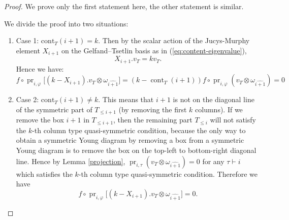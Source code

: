 \documentclass[11pt]{amsart}
\numberwithin{equation}{section}
\theoremstyle{definition}
\renewcommand{\phi}{\varphi}
\begin{document}
\begin{proof}
 We prove only the first statement here, the other statement is similar. 
 
 We divide the proof into two situations:
            \begin{enumerate}
            
            \item Case 1: \( \mathrm{cont}_{T}(\boxed{i+1})=k\). Then by the scalar action of the Jucys-Murphy element $X_{i+1}$ on the Gelfand–Tsetlin basis as in (\ref{eq:content-eigenvalue}),
            \[  X_{i+1}.v_{T}=kv_{T} . \]
            Hence we have:
             \[f\circ\operatorname{pr}_{i,\phi}\big[(k-X_{i+1}).v_{T} \otimes \omega_{\hat{i+1}}\big]=(k-\operatorname{cont}_{T}(\boxed{i+1}))f\circ\operatorname{pr}_{i,\phi}(v_{T}\otimes\omega_{\hat{i+1}})=0
             \]
             
             \item
            Case 2: \( \mathrm{cont}_{T}(\boxed{i+1})\neq k \).  This means that $\boxed{i+1}$ is not on the diagonal line of  the symmetric part of $T_{\leq i+1}$ (by removing the first $k$ columns). If we remove the box $\boxed{i+1}$ in $T_{\leq i+1}$, then the remaining part $T_{\leq i}$ will not satisfy the $k$-th column type quasi-symmetric condition, because the only way to obtain a symmetric Young diagram by removing a box from a symmetric Young diagram is to remove the box on the top-left to bottom-right diagonal line. 
           Hence by Lemma \ref{projection}, $\operatorname{pr}_{i, \tau}(v_{T}\otimes\omega_{\hat{i+1}})=0$ for any $\tau\vdash i$ which satisfies the $k$-th column type quasi-symmetric condition.
           Therefore we have 
           \[f\circ\operatorname{pr}_{i,\phi}\big[(k-X_{i+1}).v_{T} \otimes \omega_{\hat{i+1}}\big]=0.
             \]
           \end{enumerate}
\end{proof}
\end{document}
